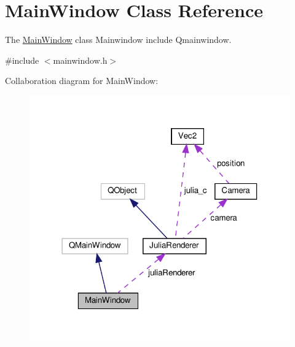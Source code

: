 \hypertarget{classMainWindow}{}\section{Main\+Window Class Reference}
\label{classMainWindow}


The \hyperlink{classMainWindow}{Main\+Window} class Mainwindow include Qmainwindow.  




{\ttfamily \#include $<$mainwindow.\+h$>$}



Collaboration diagram for Main\+Window\+:
\nopagebreak
\begin{figure}[H]
\begin{center}
\leavevmode
\includegraphics[width=318pt]{classMainWindow__coll__graph}
\end{center}
\end{figure}
